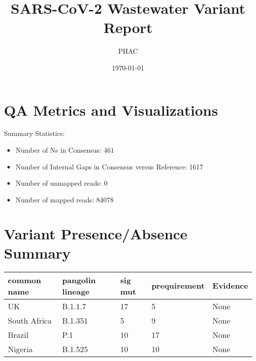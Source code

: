 \documentclass{article}
\begin{document}
\title{SARS-CoV-2 Wastewater Variant Report}
\date{\today}
\author{PHAC}
\begin{titlepage}
\maketitle
\end{titlepage}
\section{QA Metrics and Visualizations}
Summary Statistics:
\begin{itemize}
\item Number of Ns in Consensus: 461 
\item Number of Internal Gaps in Consensus versus Reference: 1617
\item Number of unmapped reads: 0
\item Number of mapped reads: 84078
\end{itemize}
\section{Variant Presence/Absence Summary}
\begin{center}
\begin{tabular}{|l|l|l|l|l|}
\hline
common name & pangolin lineage & sig mut & prequirement & Evidence \\
\hline
UK & B.1.1.7 & 17 & 5 & None \\
South Africa & B.1.351 & 5 & 9 & None \\
Brazil & P.1 & 10 & 17 & None \\
Nigeria & B.1.525 & 10 & 10 & None \\
\hline
\end{tabular}
\end{center}
\end{document}
